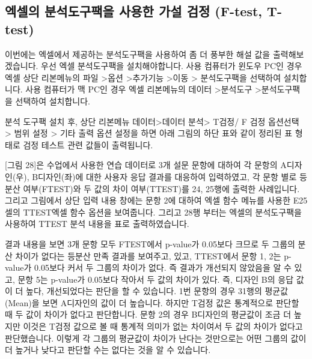 \documentclass[
  letterpaper,
]{book}
\begin{document}
\subsection{엑셀의 분석도구팩을 사용한 가설 검정 (F-test,
T-test)}\label{uxc5d1uxc140uxc758-uxbd84uxc11duxb3c4uxad6cuxd329uxc744-uxc0acuxc6a9uxd55c-uxac00uxc124-uxac80uxc815-f-test-t-test}

이번에는 엑셀에서 제공하는 분석도구팩을 사용하여 좀 더 풍부한 해설 값을
출력해보겠습니다. 우선 엑셀 분석도구팩을 설치해야합니다. 사용 컴퓨터가
윈도우 PC인 경우 엑셀 상단 리본메뉴의 파일 \textgreater 옵션
\textgreater 추가기능 \textgreater 이동 \textgreater{} 분석도구팩을
선택하여 설치합니다. 사용 컴퓨터가 맥 PC인 경우 엑셀 리본메뉴의 데이터
\textgreater 분석도구 \textgreater 분석도구팩을 선택하여 설치합니다.

분석 도구팩 설치 후, 상단 리본메뉴 데이터\textgreater 데이터
분석\textgreater{} T검정/ F 검정 옵션선택 \textgreater{} 범위 설정
\textgreater{} 기타 출력 옵션 설정을 하면 아래 그림의 하단 표와 같이
정리된 표 형태로 검정 테스트 관련 값들이 출력됩니다.

{[}그림 28{]}은 수업에서 사용한 연습 데이터로 3개 설문 문항에 대하여 각
문항의 A디자인(우), B디자인(좌)에 대한 사용자 응답 결과를 대응하여
입력하였고, 각 문항 별로 등분산 여부(FTEST)와 두 값의 차이 여부(TTEST)를
24, 25행에 출력한 사례입니다. 그리고 그림에서 상단 입력 내용 창에는 문항
2에 대하여 엑셀 함수 메뉴를 사용한 E25셀의 TTEST엑셀 함수 옵션을
보여줍니다. 그리고 28행 부터는 엑셀의 분석도구팩을 사용하여 TTEST 분석
내용을 표로 출력하였습니다.

결과 내용을 보면 3개 문항 모두 FTEST에서 p-value가 0.05보다 크므로 두
그룹의 분산 차이가 없다는 등분산 만족 결과를 보여주고, 있고, TTEST에서
문항 1, 2는 p-value가 0.05보다 커서 두 그룹의 차이가 없다. 즉 결과가
개선되지 않았음을 알 수 있고, 문항 5는 p-value가 0.05보다 작아서 두 값의
차이가 있다. 즉, 디자인 B의 응답 값이 더 높다, 개선되었다는 판단을 할 수
있습니다. 1번 문항의 경우 31행의 평균값(Mean)을 보면 A디자인의 값이 더
높습니다. 하지만 T검정 값은 통계적으로 판단할 때 두 값이 차이가 없다고
판단합니다. 문항 2의 경우 B디자인의 평균값이 조금 더 높지만 이것은 T검정
값으로 볼 때 통계적 의미가 없는 차이여서 두 값의 차이가 없다고
판단했습니다. 이렇게 각 그룹의 평균값이 차이가 난다는 것만으로는 어떤
그룹의 값이 더 높거나 낮다고 판단할 수는 없다는 것을 알 수 있습니다.
\end{document}
